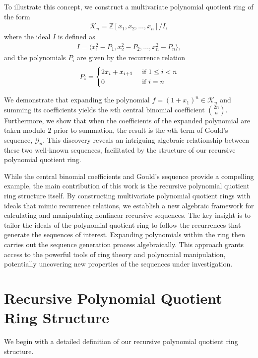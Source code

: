 \documentclass[12pt,reqno]{article}
\theoremstyle{plain}
\newcommand{\Z}{\mathbb{Z}}
\newcommand{\K}{\mathcal{K}}
\newcommand{\Goulds}{\mathcal{G}}
\begin{document}
To illustrate this concept, we construct a multivariate polynomial quotient ring of the form
\begin{align*}
\K_n = \Z[x_1, x_2, \ldots, x_n]/I ,
\end{align*}
where the ideal $I$ is defined as
\begin{align*}
I = \langle x_1^2 - P_1, x_2^2 - P_2, \ldots, x_n^2 - P_n \rangle ,
\end{align*}
and the polynomials $P_i$ are given by the recurrence relation
\begin{align*}
P_i =
\begin{cases}
    2x_i + x_{i+1} & \textup{ if } 1 \leq i < n \\
    0 &\textup{ if } i = n
\end{cases}
\end{align*}

We demonstrate that expanding the polynomial $f = (1+x_1)^n \in \K_n$ and summing its coefficients yields the $n$th central binomial coefficient $\binom{2n}{n}$. Furthermore, we show that when the coefficients of the expanded polynomial are taken modulo $2$ prior to summation, the result is the $n$th term of Gould's sequence, $\Goulds_n$. This discovery reveals an intriguing algebraic relationship between these two well-known sequences, facilitated by the structure of our recursive polynomial quotient ring.

While the central binomial coefficients and Gould's sequence provide a compelling example, the main contribution of this work is the recursive polynomial quotient ring structure itself. By constructing multivariate polynomial quotient rings with ideals that mimic recurrence relations, we establish a new algebraic framework for calculating and manipulating nonlinear recursive sequences. The key insight is to tailor the ideals of the polynomial quotient ring to follow the recurrences that generate the sequences of interest. Expanding polynomials within the ring then carries out the sequence generation process algebraically. This approach grants access to the powerful tools of ring theory and polynomial manipulation, potentially uncovering new properties of the sequences under investigation.

\section{Recursive Polynomial Quotient Ring Structure}
We begin with a detailed definition of our recursive polynomial quotient ring structure.
\end{document}
